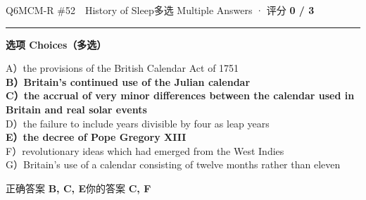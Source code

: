 \documentclass[11pt]{article}
\newcommand{\ptesub}[1]{%
  \par\needspace{2\baselineskip}\smallskip
  {\color{cAccent}\rule[-0.2ex]{3pt}{1.05em}}\hspace{6pt}%
  {\bfseries\color{cHead}#1}\par\nopagebreak\smallskip}
\begin{document}
\begin{qblock}{Q6\quad MCM-R \#52\ \ History of Sleep}{多选 Multiple Answers · 评分 \textcolor{cAccent}{\bfseries 0 / 3}}
\ptesub{选项 Choices（多选）}
{\small
A）the provisions of the British Calendar Act of 1751\\
{\color{cFix}\textbf{B）Britain's continued use of the Julian calendar}}\\
{\color{cFix}\textbf{C）the accrual of very minor differences between the calendar used in Britain and real solar events}}\\
D）the failure to include years divisible by four as leap years\\
{\color{cFix}\textbf{E）the decree of Pope Gregory XIII}}\\
F）revolutionary ideas which had emerged from the West Indies\\
G）Britain's use of a calendar consisting of twelve months rather than eleven}
\smallskip\par
{\small 正确答案 \textcolor{cFix}{\bfseries B, C, E}\qquad 你的答案 {\color{cWrong}\bfseries C, F}}
\end{qblock}
\end{document}
